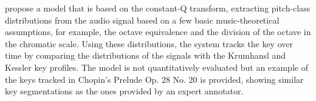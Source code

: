 
\textcite{purwins2000new} propose a model that is based on
the constant-Q transform, extracting pitch-class
distributions from the audio signal based on a few basic
music-theoretical assumptions, for example, the octave
equivalence and the division of the octave in the chromatic
scale. Using these distributions, the system tracks the key
over time by comparing the distributions of the signals with
the Krumhansl and Kessler key profiles. The model is not
quantitatively evaluated but an example of the keys tracked
in Chopin's Prelude Op. 28 No. 20 is provided, showing
similar key segmentations as the ones provided by an expert
annotator.



